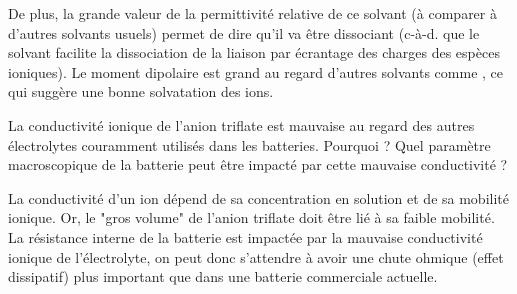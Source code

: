 \documentclass[twoside,a4paper,11pt,addpoints]{exam}%
\newcounter{foo} %
\begin{document}
\begin{questions}
\begin{mybox}
\begin{solution}[3cm]
De plus, la grande valeur de la permittivité relative de ce solvant (à comparer à d'autres solvants usuels) permet de dire qu'il va être dissociant (c-à-d. que le solvant facilite la dissociation de la liaison  par écrantage des charges des espèces ioniques). Le moment dipolaire est grand au regard d'autres solvants comme , ce qui suggère une bonne solvatation des ions.
\end{solution}\end{mybox}

\question[1] La conductivité ionique de l'anion triflate est mauvaise au regard des autres électrolytes couramment utilisés dans les batteries. Pourquoi ? Quel paramètre macroscopique de la batterie peut être impacté par cette mauvaise conductivité ?

\begin{mybox}\begin{solution}[3cm]
La conductivité d'un ion dépend de sa concentration en solution et de sa mobilité ionique. Or, le "gros volume" de l'anion triflate doit être lié à sa faible mobilité. \\
La résistance interne de la batterie est impactée par la mauvaise conductivité ionique de l'électrolyte, on peut donc s'attendre à avoir une chute ohmique (effet dissipatif) plus important que dans une batterie commerciale actuelle.
\end{solution}\end{mybox}

\setcounter{foo}{\value{question}}
\end{questions}



\end{document}

